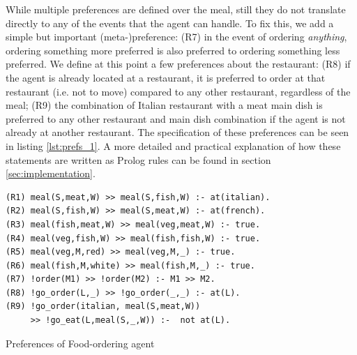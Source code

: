 

While multiple preferences are defined over the meal, still they do not translate directly to any of the events that the agent can handle. To fix this, we add a simple but important (meta-)preference: (R7) in the event of ordering \textit{anything}, ordering something more preferred is also preferred to ordering something less preferred.%
We define at this point a few preferences about the restaurant: (R8) if the agent is already located at a restaurant, it is preferred to order at that restaurant (i.e. not to move) compared to {any} other restaurant, regardless of the meal; (R9) the combination of Italian restaurant with a meat main dish is preferred to any other restaurant and main dish combination if the agent is not already at another restaurant. The specification of these preferences can be seen in listing \ref{lst:prefs_1}. A more detailed and practical explanation of how these statements are written as Prolog rules can be found in section \ref{sec:implementation}.


\begin{listing}[t]
\centering
\begin{verbatim}
(R1) meal(S,meat,W) >> meal(S,fish,W) :- at(italian).
(R2) meal(S,fish,W) >> meal(S,meat,W) :- at(french).
(R3) meal(fish,meat,W) >> meal(veg,meat,W) :- true.
(R4) meal(veg,fish,W) >> meal(fish,fish,W) :- true.
(R5) meal(veg,M,red) >> meal(veg,M,_) :- true.
(R6) meal(fish,M,white) >> meal(fish,M,_) :- true.
(R7) !order(M1) >> !order(M2) :- M1 >> M2.
(R8) !go_order(L,_) >> !go_order(_,_) :- at(L).
(R9) !go_order(italian, meal(S,meat,W)) 
     >> !go_eat(L,meal(S,_,W)) :-  not at(L).
\end{verbatim}
    \caption{Preferences of Food-ordering agent}
    \label{lst:prefs_1}
\end{listing}

